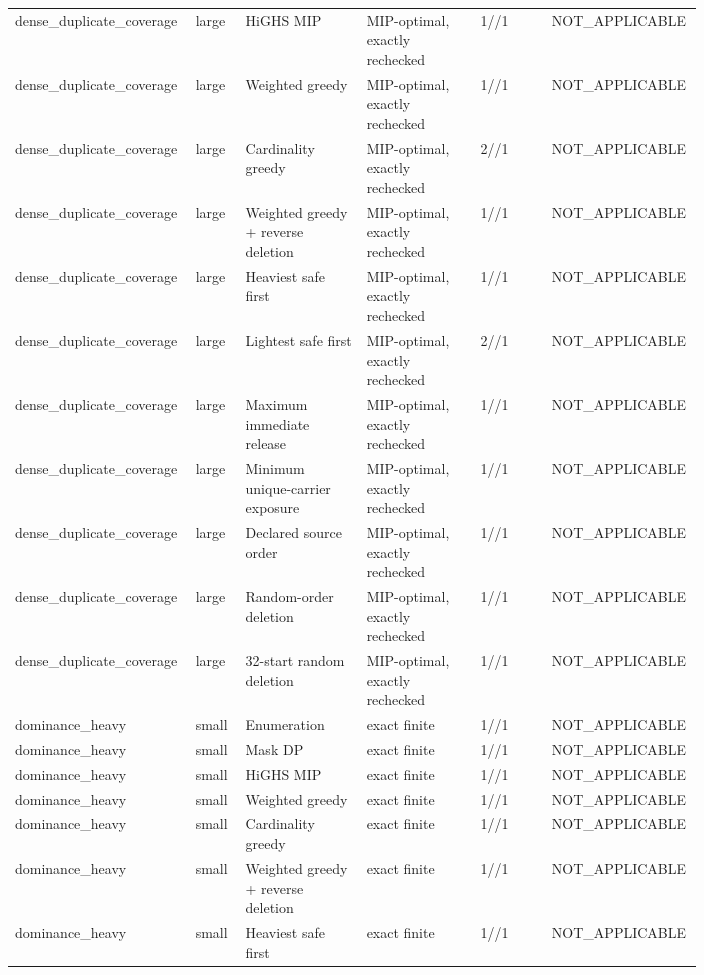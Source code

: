 {\begin{longtable}{p{0.18\linewidth}p{0.07\linewidth}p{0.17\linewidth}p{0.16\linewidth}p{0.10\linewidth}p{0.12\linewidth}}
dense\_duplicate\_coverage & large & HiGHS MIP & MIP-optimal, exactly rechecked & 1//1 & NOT\_APPLICABLE \\
dense\_duplicate\_coverage & large & Weighted greedy & MIP-optimal, exactly rechecked & 1//1 & NOT\_APPLICABLE \\
dense\_duplicate\_coverage & large & Cardinality greedy & MIP-optimal, exactly rechecked & 2//1 & NOT\_APPLICABLE \\
dense\_duplicate\_coverage & large & Weighted greedy + reverse deletion & MIP-optimal, exactly rechecked & 1//1 & NOT\_APPLICABLE \\
dense\_duplicate\_coverage & large & Heaviest safe first & MIP-optimal, exactly rechecked & 1//1 & NOT\_APPLICABLE \\
dense\_duplicate\_coverage & large & Lightest safe first & MIP-optimal, exactly rechecked & 2//1 & NOT\_APPLICABLE \\
dense\_duplicate\_coverage & large & Maximum immediate release & MIP-optimal, exactly rechecked & 1//1 & NOT\_APPLICABLE \\
dense\_duplicate\_coverage & large & Minimum unique-carrier exposure & MIP-optimal, exactly rechecked & 1//1 & NOT\_APPLICABLE \\
dense\_duplicate\_coverage & large & Declared source order & MIP-optimal, exactly rechecked & 1//1 & NOT\_APPLICABLE \\
dense\_duplicate\_coverage & large & Random-order deletion & MIP-optimal, exactly rechecked & 1//1 & NOT\_APPLICABLE \\
dense\_duplicate\_coverage & large & 32-start random deletion & MIP-optimal, exactly rechecked & 1//1 & NOT\_APPLICABLE \\
dominance\_heavy & small & Enumeration & exact finite & 1//1 & NOT\_APPLICABLE \\
dominance\_heavy & small & Mask DP & exact finite & 1//1 & NOT\_APPLICABLE \\
dominance\_heavy & small & HiGHS MIP & exact finite & 1//1 & NOT\_APPLICABLE \\
dominance\_heavy & small & Weighted greedy & exact finite & 1//1 & NOT\_APPLICABLE \\
dominance\_heavy & small & Cardinality greedy & exact finite & 1//1 & NOT\_APPLICABLE \\
dominance\_heavy & small & Weighted greedy + reverse deletion & exact finite & 1//1 & NOT\_APPLICABLE \\
dominance\_heavy & small & Heaviest safe first & exact finite & 1//1 & NOT\_APPLICABLE \\

\end{longtable}}
